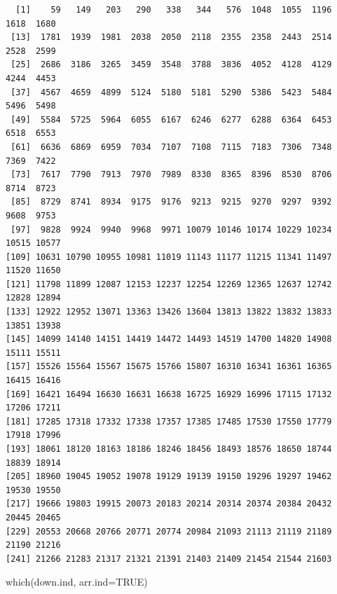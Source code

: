 \documentclass[
  letterpaper,
  DIV=11,
  numbers=noendperiod]{scrartcl}
\newenvironment{Shaded}{\begin{snugshade}}{\end{snugshade}}
\newcommand{\AttributeTok}[1]{\textcolor[rgb]{0.40,0.45,0.13}{#1}}
\newcommand{\ConstantTok}[1]{\textcolor[rgb]{0.56,0.35,0.01}{#1}}
\newcommand{\FunctionTok}[1]{\textcolor[rgb]{0.28,0.35,0.67}{#1}}
\newcommand{\NormalTok}[1]{\textcolor[rgb]{0.00,0.23,0.31}{#1}}
\begin{document}
\begin{verbatim}
  [1]    59   149   203   290   338   344   576  1048  1055  1196  1618  1680
 [13]  1781  1939  1981  2038  2050  2118  2355  2358  2443  2514  2528  2599
 [25]  2686  3186  3265  3459  3548  3788  3836  4052  4128  4129  4244  4453
 [37]  4567  4659  4899  5124  5180  5181  5290  5386  5423  5484  5496  5498
 [49]  5584  5725  5964  6055  6167  6246  6277  6288  6364  6453  6518  6553
 [61]  6636  6869  6959  7034  7107  7108  7115  7183  7306  7348  7369  7422
 [73]  7617  7790  7913  7970  7989  8330  8365  8396  8530  8706  8714  8723
 [85]  8729  8741  8934  9175  9176  9213  9215  9270  9297  9392  9608  9753
 [97]  9828  9924  9940  9968  9971 10079 10146 10174 10229 10234 10515 10577
[109] 10631 10790 10955 10981 11019 11143 11177 11215 11341 11497 11520 11650
[121] 11798 11899 12087 12153 12237 12254 12269 12365 12637 12742 12828 12894
[133] 12922 12952 13071 13363 13426 13604 13813 13822 13832 13833 13851 13938
[145] 14099 14140 14151 14419 14472 14493 14519 14700 14820 14908 15111 15511
[157] 15526 15564 15567 15675 15766 15807 16310 16341 16361 16365 16415 16416
[169] 16421 16494 16630 16631 16638 16725 16929 16996 17115 17132 17206 17211
[181] 17285 17318 17332 17338 17357 17385 17485 17530 17550 17779 17918 17996
[193] 18061 18120 18163 18186 18246 18456 18493 18576 18650 18744 18839 18914
[205] 18960 19045 19052 19078 19129 19139 19150 19296 19297 19462 19530 19550
[217] 19666 19803 19915 20073 20183 20214 20314 20374 20384 20432 20445 20465
[229] 20553 20668 20766 20771 20774 20984 21093 21113 21119 21189 21190 21216
[241] 21266 21283 21317 21321 21391 21403 21409 21454 21544 21603
\end{verbatim}

\begin{Shaded}
\begin{Highlighting}[]
\FunctionTok{which}\NormalTok{(down.ind, }\AttributeTok{arr.ind=}\ConstantTok{TRUE}\NormalTok{)}
\end{Highlighting}
\end{Shaded}
\end{document}
